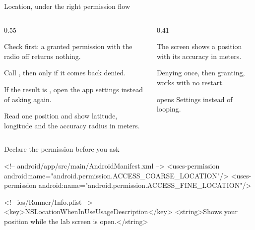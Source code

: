 \documentclass[10pt,aspectratio=169,t]{beamer}
\begin{document}
\begin{frame}[eyebrow=Task II]{Location, under the right permission flow}
  \begin{columns}[T]
    \begin{column}{0.55\textwidth}
      \begin{steps}
        \item Check  first: a granted permission with the radio off returns nothing.
        \item Call , then  only if it comes back denied.
        \item If the result is , open the app settings instead of asking again.
        \item Read one position and show latitude, longitude and the accuracy radius in meters.
      \end{steps}
    \end{column}
    \begin{column}{0.41\textwidth}
      \begin{checklist}
        \item The screen shows a position with its accuracy in meters.
        \item Denying once, then granting, works with no restart.
        \item {} opens Settings instead of looping.
      \end{checklist}
    \end{column}
  \end{columns}
\end{frame}

\begin{frame}[fragile,eyebrow=Task II]{Declare the permission before you ask}
\begin{codeblock}[language=XML]
<!-- android/app/src/main/AndroidManifest.xml -->
<uses-permission android:name="android.permission.ACCESS_COARSE_LOCATION"/>
<uses-permission android:name="android.permission.ACCESS_FINE_LOCATION"/>

<!-- ios/Runner/Info.plist -->
<key>NSLocationWhenInUseUsageDescription</key>
<string>Shows your position while the lab screen is open.</string>
\end{codeblock}
\end{frame}
\end{document}
